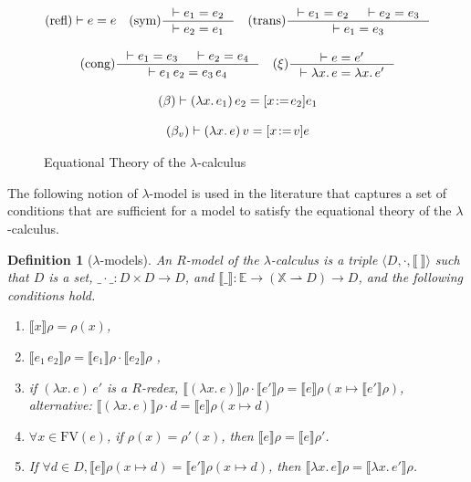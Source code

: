 \documentclass{tufte-handout}
\newcommand{\SEM}[1]{\llbracket #1 \rrbracket}
\newcommand{\LAM}[1]{\lambda #1.\,}
\newcommand{\APP}[0]{\,}
\newcommand{\by}[0]{\!:=\!}
\newcommand{\pto}[0]{\rightharpoonup}
\newcommand{\VAR}[0]{\mathbb{X}}
\newcommand{\ext}[3]{#3(#1{\mapsto}#2)}
\newtheorem{definition}{Definition}%
\begin{document}
\begin{figure}
\begin{gather*}
  \text{(refl)}  \vdash e = e
  \quad
  \text{(sym)}   \inference{\vdash e_1 = e_2}{\vdash e_2 = e_1}  
  \quad
  \text{(trans)}  \inference{\vdash e_1 = e_2 & \vdash e_2 = e_3}{\vdash e_1 = e_3} \\[2ex]
  \text{(cong)}  \inference{\vdash e_1 = e_3 & \vdash e_2 = e_4}
                            {\vdash e_1 \APP e_2 = e_3 \APP e_4}
   \quad
  \text{($\xi$)}  \inference{\vdash e = e'}{\vdash \LAM{x}e = \LAM{x}e'} \\[2ex]
  \text{($\beta$)}  \vdash (\LAM{x}e_1)\APP e_2 = [x\by e_2]e_1 \\[2ex]
  \text{($\beta_v$)}  \vdash (\LAM{x}e)\APP v = [x\by v]e
\end{gather*}
\caption{Equational Theory of the $\lambda$-calculus}
\label{fig:lambda-eq}
\end{figure}





The following notion of $\lambda$-model is used in the literature that
captures a set of conditions that are sufficient for a model to
satisfy the equational theory of the $\lambda$-calculus.

\begin{definition}[$\lambda$-models]
  An \emph{$R$-model of the $\lambda$-calculus} is a triple $\langle
  D, \cdot, \SEM{\ }\rangle$ such that $D$ is a set, $\_\cdot\_:D \times D
  \to D$, and $\SEM{\_} : \mathbb{E}\to(\VAR\pto D)\to D$, and the
  following conditions hold.
  \begin{enumerate}
  \item $\SEM{ x}\rho = \rho(x)$, \label{cond:var}
  \item $\SEM{e_1\APP e_2}\rho = \SEM{e_1}\rho \cdot \SEM{e_2}\rho$ \label{cond:app},
  \item if $(\LAM{x}e) \APP e'$ is a $R$-redex, $\SEM{(\LAM{x}e)}\rho \cdot \SEM{e'}\rho = \SEM{e}\ext{x}{\SEM{e'}\rho}{\rho}$\label{cond:R}, \\
        alternative: $\SEM{(\LAM{x}e)}\rho \cdot d = \SEM{e}\ext{x}{ d}{\rho}$ \label{cond:lam-app}
  \item $\forall x \in \mathrm{FV}(e)$, if  $\rho(x) = \rho'(x)$,
       then $\SEM{e}\rho = \SEM{e}\rho'$. \label{cond:env}
  \item If $\forall d \in D, \SEM{e}\ext{x}{ d}{\rho} = \SEM{e'}\ext{x}{ d}{\rho}$,
       then $\SEM{\LAM{x} e}\rho = \SEM{\LAM{x} e'}\rho$. \label{cond:lam}
  \end{enumerate}
\end{definition}
\end{document}
